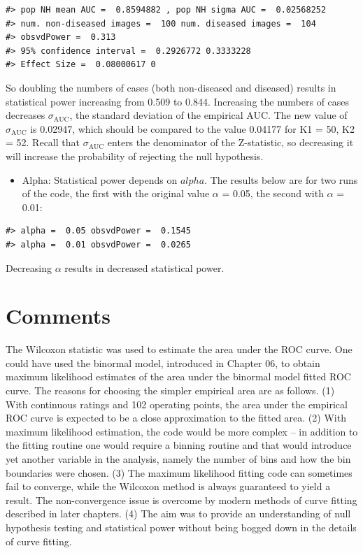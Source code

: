 \documentclass[
]{book}
\providecommand{\tightlist}{%
  \setlength{\itemsep}{0pt}\setlength{\parskip}{0pt}}
\begin{document}
\begin{verbatim}
#> pop NH mean AUC =  0.8594882 , pop NH sigma AUC =  0.02568252
#> num. non-diseased images =  100 num. diseased images =  104
#> obsvdPower =  0.313
#> 95% confidence interval =  0.2926772 0.3333228
#> Effect Size =  0.08000617 0
\end{verbatim}

So doubling the numbers of cases (both non-diseased and diseased) results in statistical power increasing from 0.509 to 0.844. Increasing the numbers of cases decreases \(\sigma_{\text{AUC}}\), the standard deviation of the empirical AUC. The new value of \(\sigma_{\text{AUC}}\) is 0.02947, which should be compared to the value 0.04177 for K1 = 50, K2 = 52. Recall that \(\sigma_{\text{AUC}}\) enters the denominator of the Z-statistic, so decreasing it will increase the probability of rejecting the null hypothesis.

\begin{itemize}
\tightlist
\item
  Alpha: Statistical power depends on \(alpha\). The results below are for two runs of the code, the first with the original value \(\alpha\) = 0.05, the second with \(\alpha\) = 0.01:
\end{itemize}

\begin{verbatim}
#> alpha =  0.05 obsvdPower =  0.1545 
#> alpha =  0.01 obsvdPower =  0.0265
\end{verbatim}

Decreasing \(\alpha\) results in decreased statistical power.

\hypertarget{hypothesis-testingComments}{%
\section{Comments}\label{hypothesis-testingComments}}

The Wilcoxon statistic was used to estimate the area under the ROC curve. One could have used the binormal model, introduced in Chapter 06, to obtain maximum likelihood estimates of the area under the binormal model fitted ROC curve. The reasons for choosing the simpler empirical area are as follows. (1) With continuous ratings and 102 operating points, the area under the empirical ROC curve is expected to be a close approximation to the fitted area. (2) With maximum likelihood estimation, the code would be more complex -- in addition to the fitting routine one would require a binning routine and that would introduce yet another variable in the analysis, namely the number of bins and how the bin boundaries were chosen. (3) The maximum likelihood fitting code can sometimes fail to converge, while the Wilcoxon method is always guaranteed to yield a result. The non-convergence issue is overcome by modern methods of curve fitting described in later chapters. (4) The aim was to provide an understanding of null hypothesis testing and statistical power without being bogged down in the details of curve fitting.
\end{document}
